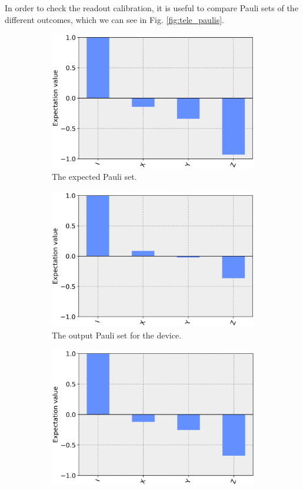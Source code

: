 In order to check the readout calibration, it is useful to compare Pauli sets of
the different outcomes, which we can see in Fig. \ref{fig:tele_paulis}.

\begin{figure}[h!]
  \begin{subfigure}{.5\textwidth}
    \centering
    \includegraphics[width=.8\linewidth]{images/results/tele_pauli_sim.png}
    \caption{The expected Pauli set.}
    \label{fig:tele_pauli_sim}
  \end{subfigure}
  \newline
  \begin{subfigure}{.5\textwidth}
    \centering
    \includegraphics[width=.8\linewidth]{images/results/tele_pauli_dev.png}
    \caption{The output Pauli set for the device.}
    \label{fig:tele_pauli_dev}
  \end{subfigure}
  \newline
  \begin{subfigure}{.5\textwidth}
    \centering
    \includegraphics[width=.8\linewidth]{images/results/tele_pauli_cal.png}

\end{subfigure}
\end{figure}

